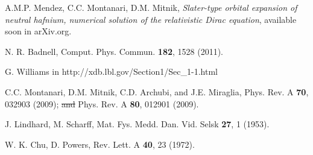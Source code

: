 \documentclass[aps,pra,reprint,superscriptaddress]{revtex4-1}
\providecommand{\DIFdel}[1]{{\protect\color{red}\sout{#1}}}                      %
\providecommand{\DIFdelbegin}{} %
\providecommand{\DIFdelend}{} %
\newcommand{\DIFscaledelfig}{0.5}
\newlength{\DIFdelgraphicswidth} %
\newlength{\DIFdelgraphicsheight} %
\newcommand{\DIFdelincludegraphics}[2][]{%
\sbox{\DIFdelgraphicsbox}{\DIFOincludegraphics[#1]{#2}}%
\settoboxwidth{\DIFdelgraphicswidth}{\DIFdelgraphicsbox} %
\settoboxtotalheight{\DIFdelgraphicsheight}{\DIFdelgraphicsbox} %
\scalebox{\DIFscaledelfig}{%
\parbox[b]{\DIFdelgraphicswidth}{\usebox{\DIFdelgraphicsbox}\\[-\baselineskip] \rule{\DIFdelgraphicswidth}{0em}}\llap{\resizebox{\DIFdelgraphicswidth}{\DIFdelgraphicsheight}{%
\setlength{\unitlength}{\DIFdelgraphicswidth}%
\begin{picture}(1,1)%
\thicklines\linethickness{2pt} %
{\color[rgb]{1,0,0}\put(0,0){\framebox(1,1){}}}%
{\color[rgb]{1,0,0}\put(0,0){\line( 1,1){1}}}%
{\color[rgb]{1,0,0}\put(0,1){\line(1,-1){1}}}%
\end{picture}%
}\hspace*{3pt}}} %
} %
\DeclareRobustCommand{\DIFdelbegin}{\DIFOdelbegin \let\includegraphics\DIFdelincludegraphics} %
\DeclareRobustCommand{\DIFdelend}{\DIFOaddend \let\includegraphics\DIFOincludegraphics} %
\begin{document}
\begin{thebibliography}{00}
A.M.P. Mendez, C.C. Montanari, D.M. Mitnik, 
\textit{Slater-type orbital expansion of neutral hafnium, numerical 
solution of the relativistic Dirac equation}, 
available soon in arXiv.org. 

N. R. Badnell, Comput. Phys. Commun. \textbf{182}, 1528 (2011).

G. Williams in http://xdb.lbl.gov/Section1/Sec\_1-1.html

C.C. Montanari, D.M. Mitnik, C.D. Archubi, and J.E. Miraglia, 
Phys. Rev. A \textbf{70}, 032903 (2009); 
\DIFdelbegin \DIFdel{and }\DIFdelend Phys. Rev. A \textbf{80}, 012901 (2009).

J. Lindhard, M. Scharff,  
Mat. Fys. Medd. Dan. Vid. Selsk  \textbf{27}, 1 (1953).

W. K. Chu, D. Powers, 
Rev. Lett. A \textbf{40}, 23 (1972).

\end{thebibliography}
\end{document}
